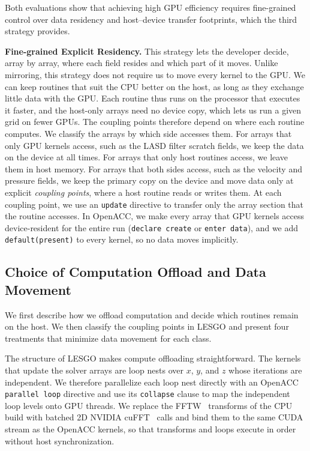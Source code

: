 Both evaluations show that achieving high GPU efficiency requires
fine-grained control over data residency and host--device transfer
footprints, which the third strategy provides.

\vspace{0.08in}
\noindent\textbf{Fine-grained Explicit Residency.} This strategy lets the
developer decide, array by array, where each field resides and which
part of it moves. Unlike mirroring, this strategy does not require us to move every
kernel to the GPU. We can keep routines that suit the CPU better on the
host, as long as they exchange little data with the GPU. Each routine
thus runs on the processor that executes it faster, and the host-only
arrays need no device copy, which lets us run a given grid on fewer
GPUs. The coupling points therefore depend on where each routine
computes. We classify the arrays by which side accesses them.
For arrays that only GPU kernels access, such as the LASD filter scratch
fields, we keep the data on the device at all times. For arrays that
only host routines access, we leave them in host memory. 
For arrays that both sides access, such as the
velocity and pressure fields, we keep the primary copy on the device and
move data only at explicit \emph{coupling points}, where a host routine
reads or writes them. At each coupling point, we use an \texttt{update}
directive to transfer only the array section that the routine accesses.
In OpenACC, we make every array that GPU kernels access device-resident
for the entire run (\texttt{declare create} or \texttt{enter data}), and
we add \texttt{default(present)} to every kernel, so no data moves
implicitly.

\subsection{Choice of Computation Offload and Data Movement}
\label{sec:method-taxonomy}

We first describe how we offload computation and decide which routines remain on
the host. We then classify the coupling points in LESGO and
present four treatments that minimize data movement for each class.

The structure of LESGO makes compute offloading straightforward. The
kernels that update the solver arrays are loop nests over $x$, $y$, and
$z$ whose iterations are independent. We therefore parallelize each
loop nest directly with an OpenACC \texttt{parallel loop} directive and
use its \texttt{collapse} clause to map the independent loop levels
onto GPU threads. We replace the FFTW~\cite{FFTW3} transforms of the
CPU build with batched 2D NVIDIA cuFFT~\cite{cufft} calls and bind them
to the same CUDA stream as the OpenACC kernels, so that transforms and
loops execute in order without host synchronization.

